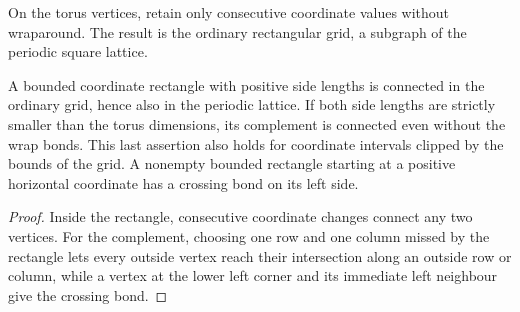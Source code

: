 

\begin{definition}%
    \label{def:peps_torus_rectangular_grid}
    \leanok
    On the torus vertices, retain only consecutive coordinate values
    without wraparound. The result is the ordinary rectangular grid,
    a subgraph of the periodic square lattice.
\end{definition}

\begin{lemma}%
    \label{thm:peps_torus_rectangle_cut_connectivity}
    \leanok
    A bounded coordinate rectangle with positive side lengths is connected
    in the ordinary grid, hence also in the periodic lattice.
    If both side lengths are strictly smaller than the torus dimensions,
    its complement is connected even without the wrap bonds. This last
    assertion also holds for coordinate intervals clipped by the bounds
    of the grid. A nonempty bounded rectangle starting at a positive
    horizontal coordinate has a crossing bond on its left side.
\end{lemma}

\begin{proof}\leanok
    Inside the rectangle, consecutive coordinate changes connect any two vertices.
    For the complement, choosing one row and one column missed by the
    rectangle lets every outside vertex reach their intersection along
    an outside row or column, while a vertex at the lower left corner and
    its immediate left neighbour give the crossing bond.
\end{proof}



